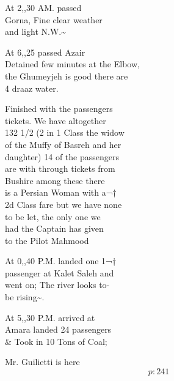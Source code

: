 \documentclass{report}
\begin{document}




	\par{
 	At 2,,30 AM. passed\ \\Gorna, Fine clear weather\ \\and light N.W.\~{}\ \\
	}

	\par{
 	At 6,,25 passed Azair\ \\Detained few minutes at the Elbow,\ \\the Ghumeyjeh is good there are\ \\4 draaz water.\ \\
	}

	\par{
 	Finished with the passengers\ \\tickets. We have altogether\ \\132 1/2 (2 in 1 Class the widow\ \\of the Muffy of Basreh and her\ \\daughter) 14 of the passengers\ \\are with through tickets from\ \\Bushire among these there\ \\is a Persian Woman with a¬†\ \\2d Class fare but we have none\ \\to be let, the only one we\ \\had the Captain has given\ \\to the Pilot Mahmood\ \\
	}

	\par{
 	At 0,,40 P.M. landed one 1¬†\ \\passenger at Kalet Saleh and\ \\went on; The river looks to-\ \\be rising\~{}.\ \\
	}

	\par{
 	At 5,,30 P.M. arrived at\ \\Amara landed 24 passengers\ \\\& Took in 10 Tons of Coal;\ \\
	}

	\par{
 	Mr. Guilietti is here\ \\
  \[p: 241 \]

	}
\end{document}
